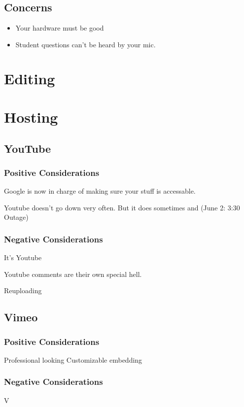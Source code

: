 \documentclass[sigconf]{acmart}
\begin{document}
\subsection{Concerns}
\begin{itemize}
	\item Your hardware must be good
	\item Student questions can't be heard by your mic.
\end{itemize}

\section{Editing}

\section{Hosting}

\subsection{YouTube}


\subsubsection{Positive Considerations}
Google is now in charge of making sure your stuff is accessable.


Youtube doesn't go down very often.  But it does sometimes \cite{outage2018} and (June 2: 3:30 Outage)

\subsubsection{Negative Considerations}

It's Youtube

Youtube comments are their own special hell.


Reuploading


\subsection{Vimeo}

\subsubsection{Positive Considerations}
Professional looking
Customizable embedding

\subsubsection{Negative Considerations}
V
\end{document}
